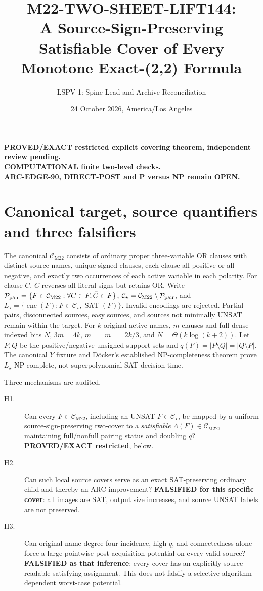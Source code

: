 \documentclass[11pt]{article}
\title{M22-TWO-SHEET-LIFT144:\\A Source-Sign-Preserving Satisfiable Cover of Every Monotone Exact-(2,2) Formula}
\author{LSPV-1: Spine Lead and Archive Reconciliation}
\date{24 October 2026, America/Los Angeles}
\newcommand{\CM}{\mathcal C_{\mathrm{M22}}}
\newcommand{\CS}{\mathcal C_\star}
\begin{document}
\maketitle
\begin{center}
\textbf{PROVED/EXACT restricted explicit covering theorem, independent review pending.}\\
\textbf{COMPUTATIONAL finite two-level checks.}\\
\textbf{ARC-EDGE-90, DIRECT-POST and P versus NP remain OPEN.}
\end{center}

\section{Canonical target, source quantifiers and three falsifiers}
The canonical \(\CM\) consists of ordinary proper three-variable OR clauses with
distinct source names, unique signed clauses, each clause all-positive or
all-negative, and exactly two occurrences of each active variable in each
polarity.  For clause \(C\), \(\bar C\) reverses all literal signs but retains OR.
Write \(\mathcal P_{\rm pair}=\{F\in\CM:\forall C\in F,\bar C\in F\}\),
\(\CS=\CM\setminus\mathcal P_{\rm pair}\), and
\(L_\star=\{\operatorname{enc}(F):F\in\CS,\operatorname{SAT}(F)\}\).
Invalid encodings are rejected.  Partial pairs, disconnected sources, easy
sources, and sources not minimally UNSAT remain within the target.
For \(k\) original active names, \(m\) clauses and full dense indexed bits \(N\),
\(3m=4k\), \(m_+=m_-=2k/3\), and
\(N=\Theta(k\log(k+2))\).
Let \(P,Q\) be the positive/negative unsigned support sets and
\(q(F)=|P\setminus Q|=|Q\setminus P|\).
The canonical \(Y\) fixture and D\"ocker's established NP-completeness theorem
prove \(L_\star\) NP-complete, not superpolynomial SAT decision time.

Three mechanisms are audited.
\begin{description}
\item[H1.] Can every \(F\in\CM\), including an UNSAT \(F\in\CS\), be
mapped by a uniform source-sign-preserving two-cover to a \emph{satisfiable}
\(\Lambda(F)\in\CM\), maintaining full/nonfull pairing status and
doubling \(q\)? \textbf{PROVED/EXACT restricted}, below.
\item[H2.] Can such local source covers serve as an exact SAT-preserving
ordinary child and thereby an ARC improvement? \textbf{FALSIFIED for this
specific cover}: all images are SAT, output size increases, and source UNSAT
labels are not preserved.
\item[H3.] Can original-name degree-four incidence, high \(q\), and
connectedness alone force a large pointwise post-acquisition potential
on every valid source? \textbf{FALSIFIED as that inference}: every cover
has an explicitly source-readable satisfying assignment.  This does not
falsify a selective algorithm-dependent worst-case potential.
\end{description}
\end{document}
